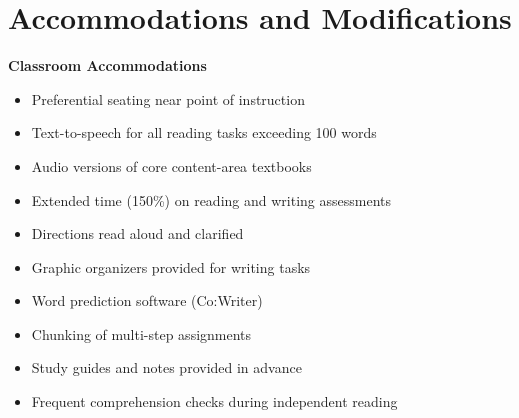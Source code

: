 \section{Accommodations and Modifications}

\begin{minipage}{0.48\textwidth}
\begin{iepbox}
{\bfseries\color{IEPNavy}\Large Classroom Accommodations}\\
\begin{itemize}[leftmargin=*,nosep,label=\textcolor{IEPTeal}{\faCheckSquare}]
  \item Preferential seating near point of instruction
  \item Text-to-speech for all reading tasks exceeding 100 words
  \item Audio versions of core content-area textbooks
  \item Extended time (150\%) on reading and writing assessments
  \item Directions read aloud and clarified
  \item Graphic organizers provided for writing tasks
  \item Word prediction software (Co:Writer)
  \item Chunking of multi-step assignments
  \item Study guides and notes provided in advance
  \item Frequent comprehension checks during independent reading
\end{itemize}
\end{iepbox}
\end{minipage}%
\hfill
